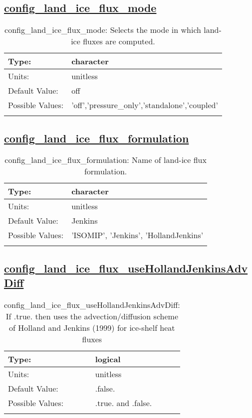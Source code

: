 \subsection[config\_land\_ice\_flux\_mode]{\hyperref[sec:nm_tab_land_ice_fluxes]{config\_land\_ice\_flux\_mode}}
\label{subsec:nm_sec_config_land_ice_flux_mode}
\begin{center}
\begin{longtable}{| p{2.0in} || p{4.0in} |}
    \hline
    Type: & character \\
    \hline
    Units: & \si{unitless} \\
    \hline
    Default Value: & off \\
    \hline
    Possible Values: & 'off','pressure\_only','standalone','coupled' \\
    \hline
    \caption{config\_land\_ice\_flux\_mode: Selects the mode in which land-ice fluxes are computed.}
\end{longtable}
\end{center}
\subsection[config\_land\_ice\_flux\_formulation]{\hyperref[sec:nm_tab_land_ice_fluxes]{config\_land\_ice\_flux\_formulation}}
\label{subsec:nm_sec_config_land_ice_flux_formulation}
\begin{center}
\begin{longtable}{| p{2.0in} || p{4.0in} |}
    \hline
    Type: & character \\
    \hline
    Units: & \si{unitless} \\
    \hline
    Default Value: & Jenkins \\
    \hline
    Possible Values: & 'ISOMIP', 'Jenkins', 'HollandJenkins' \\
    \hline
    \caption{config\_land\_ice\_flux\_formulation: Name of land-ice flux formulation.}
\end{longtable}
\end{center}
\subsection[config\_land\_ice\_flux\_useHollandJenkinsAdvDiff]{\hyperref[sec:nm_tab_land_ice_fluxes]{config\_land\_ice\_flux\_useHollandJenkinsAdvDiff}}
\label{subsec:nm_sec_config_land_ice_flux_useHollandJenkinsAdvDiff}
\begin{center}
\begin{longtable}{| p{2.0in} || p{4.0in} |}
    \hline
    Type: & logical \\
    \hline
    Units: & \si{unitless} \\
    \hline
    Default Value: & .false. \\
    \hline
    Possible Values: & .true. and .false. \\
    \hline
    \caption{config\_land\_ice\_flux\_useHollandJenkinsAdvDiff: If .true. then uses the advection/diffusion scheme of Holland and Jenkins (1999) for ice-shelf heat fluxes}
\end{longtable}
\end{center}
